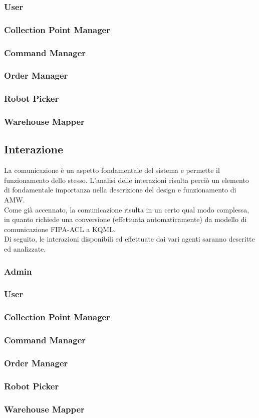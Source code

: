 \subsubsection{User}
\subsubsection{Collection Point Manager}
\subsubsection{Command Manager}
\subsubsection{Order Manager}
\subsubsection{Robot Picker}
\subsubsection{Warehouse Mapper}

\subsection{Interazione}


La comunicazione è un aspetto fondamentale del sistema e permette il funzionamento dello stesso. L'analisi delle interazioni risulta perciò un elemento di fondamentale importanza nella descrizione del design e funzionamento di AMW.\\
Come già accennato, la comunicazione risulta in un certo qual modo complessa, in quanto richiede una conversione (effettuata automaticamente) da modello di comunicazione FIPA-ACL a KQML.\\
Di seguito, le interazioni disponibili ed effettuate dai vari agenti saranno descritte ed analizzate.

\subsubsection{Admin}
\subsubsection{User}
\subsubsection{Collection Point Manager}
\subsubsection{Command Manager}
\subsubsection{Order Manager}
\subsubsection{Robot Picker}
\subsubsection{Warehouse Mapper}
